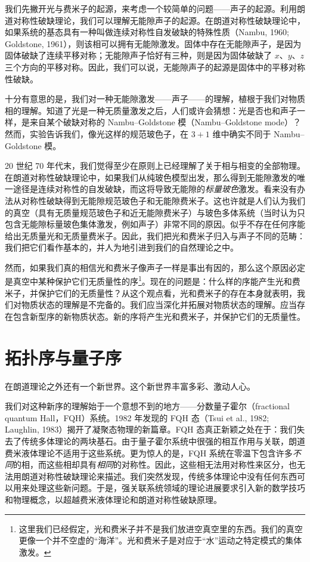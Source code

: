 我们先撇开光与费米子的起源，来考虑一个较简单的问题——声子的起源。利用朗道对称性破缺理论，我们可以理解无能隙声子的起源。在朗道对称性破缺理论中，如果系统的基态具有一种叫做连续对称性自发破缺的特殊性质（Nambu, 1960; Goldstone, 1961），则该相可以拥有无能隙激发。固体中存在无能隙声子，是因为固体破缺了连续平移对称；无能隙声子恰好有三种，则是因为固体破缺了 $x$、$y$、$z$ 三个方向的平移对称。因此，我们可以说，无能隙声子的起源是固体中的平移对称性破缺。

十分有意思的是，我们对一种无能隙激发——声子——的理解，植根于我们对物质相的理解。知道了光是一种无质量激发之后，人们或许会猜想：光是否也和声子一样，是来自某个破缺对称的 Nambu–Goldstone 模（Nambu–Goldstone mode）？然而，实验告诉我们，像光这样的规范玻色子，在 $3+1$ 维中确实不同于 Nambu–Goldstone 模。

20 世纪 70 年代末，我们觉得至少在原则上已经理解了关于相与相变的全部物理。在朗道对称性破缺理论中，如果我们从纯玻色模型出发，那么得到无能隙激发的唯一途径是连续对称性的自发破缺，而这将导致无能隙的\emph{标量玻色}激发。看来没有办法从对称性破缺得到无能隙规范玻色子和无能隙费米子。这也许就是人们认为我们的真空（具有无质量规范玻色子和近无能隙费米子）与玻色多体系统（当时认为只包含无能隙标量玻色集体激发，例如声子）非常不同的原因。似乎不存在任何序能给出无质量光和无质量费米子。因此，我们把光和费米子归入与声子不同的范畴：我们把它们看作基本的，并人为地引进到我们的自然理论之中。

然而，如果我们真的相信光和费米子像声子一样是事出有因的，那么这个原因必定是真空中某种保护它们无质量性的序\footnote{这里我们已经假定，光和费米子并不是我们放进空真空里的东西。我们的真空更像一个并不空虚的“海洋”。光和费米子是对应于“水”运动之特定模式的集体激发。}。现在的问题是：什么样的序能产生光和费米子，并保护它们的无质量性？从这个观点看，光和费米子的存在本身就表明，我们对物质状态的理解是不完备的。我们应当深化并拓展对物质状态的理解。应当存在包含新型序的新物质状态。新的序将产生光和费米子，并保护它们的无质量性。

\section{拓扑序与量子序}

\begin{keypoints}
\item 在朗道理论之外还有一个新世界。这个新世界丰富多彩、激动人心。
\end{keypoints}

我们对这种新序的理解始于一个意想不到的地方——分数量子霍尔（fractional quantum Hall，FQH）系统。1982 年发现的 FQH 态（Tsui et al., 1982; Laughlin, 1983）揭开了凝聚态物理的新篇章。FQH 态真正新颖之处在于：我们失去了传统多体理论的两块基石。由于量子霍尔系统中很强的相互作用与关联，朗道费米液体理论不适用于这些系统。更为惊人的是，FQH 系统在零温下包含许多\emph{不同}的相，而这些相却具有\emph{相同}的对称性。因此，这些相无法用对称性来区分，也无法用朗道对称性破缺理论来描述。我们突然发现，传统多体理论中没有任何东西可以用来处理这些新问题。于是，强关联系统领域的理论进展要求引入新的数学技巧和物理概念，以超越费米液体理论和朗道对称性破缺原理。

